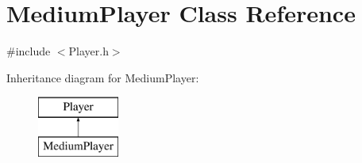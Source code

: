 \hypertarget{class_medium_player}{}\section{Medium\+Player Class Reference}
\label{class_medium_player}


{\ttfamily \#include $<$Player.\+h$>$}

Inheritance diagram for Medium\+Player\+:\begin{figure}[H]
\begin{center}
\leavevmode
\includegraphics[height=2.000000cm]{class_medium_player}
\end{center}
\end{figure}
